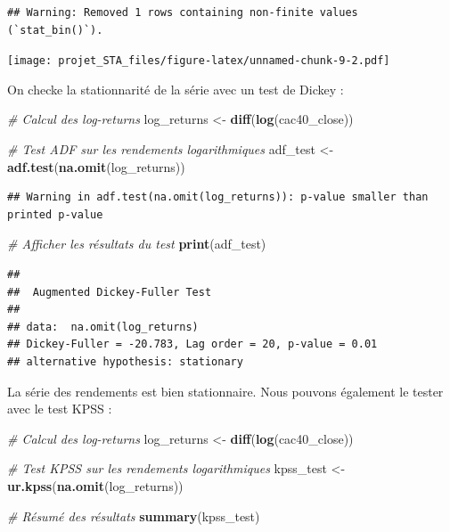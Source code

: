 \documentclass[
]{article}
\newenvironment{Shaded}{\begin{snugshade}}{\end{snugshade}}
\newcommand{\CommentTok}[1]{\textcolor[rgb]{0.56,0.35,0.01}{\textit{#1}}}
\newcommand{\FunctionTok}[1]{\textcolor[rgb]{0.13,0.29,0.53}{\textbf{#1}}}
\newcommand{\NormalTok}[1]{#1}
\newcommand{\OtherTok}[1]{\textcolor[rgb]{0.56,0.35,0.01}{#1}}
\begin{document}
\begin{verbatim}
## Warning: Removed 1 rows containing non-finite values (`stat_bin()`).
\end{verbatim}

\texttt{[image: projet\_STA\_files/figure-latex/unnamed-chunk-9-2.pdf]}

On checke la stationnarité de la série avec un test de Dickey :

\begin{Shaded}
\begin{Highlighting}[]
\CommentTok{\# Calcul des log{-}returns}
\NormalTok{log\_returns }\OtherTok{\textless{}{-}} \FunctionTok{diff}\NormalTok{(}\FunctionTok{log}\NormalTok{(cac40\_close))}

\CommentTok{\# Test ADF sur les rendements logarithmiques}
\NormalTok{adf\_test }\OtherTok{\textless{}{-}} \FunctionTok{adf.test}\NormalTok{(}\FunctionTok{na.omit}\NormalTok{(log\_returns))}
\end{Highlighting}
\end{Shaded}

\begin{verbatim}
## Warning in adf.test(na.omit(log_returns)): p-value smaller than printed p-value
\end{verbatim}

\begin{Shaded}
\begin{Highlighting}[]
\CommentTok{\# Afficher les résultats du test}
\FunctionTok{print}\NormalTok{(adf\_test)}
\end{Highlighting}
\end{Shaded}

\begin{verbatim}
## 
##  Augmented Dickey-Fuller Test
## 
## data:  na.omit(log_returns)
## Dickey-Fuller = -20.783, Lag order = 20, p-value = 0.01
## alternative hypothesis: stationary
\end{verbatim}

La série des rendements est bien stationnaire. Nous pouvons également le
tester avec le test KPSS :

\begin{Shaded}
\begin{Highlighting}[]
\CommentTok{\# Calcul des log{-}returns}
\NormalTok{log\_returns }\OtherTok{\textless{}{-}} \FunctionTok{diff}\NormalTok{(}\FunctionTok{log}\NormalTok{(cac40\_close))}

\CommentTok{\# Test KPSS sur les rendements logarithmiques}
\NormalTok{kpss\_test }\OtherTok{\textless{}{-}} \FunctionTok{ur.kpss}\NormalTok{(}\FunctionTok{na.omit}\NormalTok{(log\_returns))}

\CommentTok{\# Résumé des résultats}
\FunctionTok{summary}\NormalTok{(kpss\_test)}
\end{Highlighting}
\end{Shaded}
\end{document}
